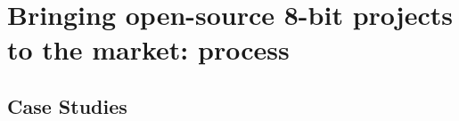 
\chapter{Bringing open-source 8-bit projects to the market: process}
\label{Chapter4}

\section{Case Studies}
